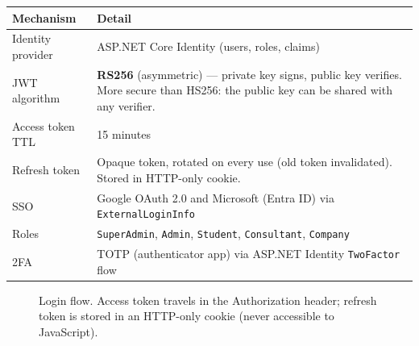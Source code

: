 \documentclass[11pt,a4paper]{article}
\begin{document}
\begin{center}
\begin{tabular}{lp{10cm}}
\toprule
\textbf{Mechanism} & \textbf{Detail}\\
\midrule
Identity provider & ASP.NET Core Identity (users, roles, claims)\\
JWT algorithm & \textbf{RS256} (asymmetric) --- private key signs, public key verifies.
  More secure than HS256: the public key can be shared with any verifier.\\
Access token TTL & 15 minutes\\
Refresh token & Opaque token, rotated on every use (old token invalidated).
  Stored in HTTP-only cookie.\\
SSO & Google OAuth 2.0 and Microsoft (Entra ID) via \texttt{ExternalLoginInfo}\\
Roles & \texttt{SuperAdmin}, \texttt{Admin}, \texttt{Student},
        \texttt{Consultant}, \texttt{Company}\\
2FA & TOTP (authenticator app) via ASP.NET Identity \texttt{TwoFactor} flow\\
\bottomrule
\end{tabular}
\end{center}

\begin{figure}[H]
\centering
{}
\caption{Login flow. Access token travels in the Authorization header;
  refresh token is stored in an HTTP-only cookie (never accessible to JavaScript).}
\end{figure}
\end{document}
